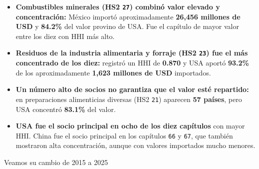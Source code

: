 \documentclass[
]{article}
\begin{document}
\begin{itemize}
\item
  \textbf{Combustibles minerales (HS2 \texttt{27}) combinó valor elevado
  y concentración:} México importó aproximadamente \textbf{26,456
  millones de USD} y \textbf{84.2\%} del valor provino de USA. Fue el
  capítulo de mayor valor entre los diez con HHI más alto.
\item
  \textbf{Residuos de la industria alimentaria y forraje (HS2
  \texttt{23}) fue el más concentrado de los diez:} registró un HHI de
  \textbf{0.870} y USA aportó \textbf{93.2\%} de los aproximadamente
  \textbf{1,623 millones de USD} importados.
\item
  \textbf{Un número alto de socios no garantiza que el valor esté
  repartido:} en preparaciones alimenticias diversas (HS2 \texttt{21})
  aparecen \textbf{57 países}, pero USA concentró \textbf{83.1\%} del
  valor.
\item
  \textbf{USA fue el socio principal en ocho de los diez capítulos} con
  mayor HHI. China fue el socio principal en los capítulos \texttt{66} y
  \texttt{67}, que también mostraron alta concentración, aunque con
  valores importados mucho menores.
\end{itemize}

Veamos su cambio de 2015 a 2025
\end{document}
